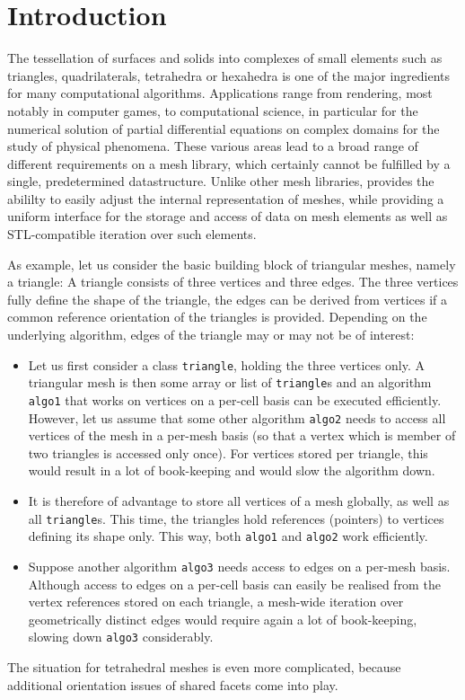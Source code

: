 
\chapter*{Introduction}    \label{intro}

The tessellation of surfaces and solids into complexes of small elements such as triangles, quadrilaterals, tetrahedra or hexahedra is one of the major
ingredients for many computational algorithms. Applications range from rendering, most notably in computer games, to computational science, in particular for the numerical solution of partial differential equations on complex domains for the study of physical phenomena. These various areas lead to a broad range of different requirements on a mesh library, which certainly cannot be fulfilled by a single, predetermined datastructure. Unlike other mesh libraries, {\ViennaGrid} provides the abililty to easily adjust the internal representation of meshes, while providing a uniform interface for the storage and access of data on mesh elements as well as STL-compatible iteration over such elements.

As example, let us consider the basic building block of triangular meshes, namely a triangle: A triangle consists of three vertices and three edges. The three vertices fully define the shape of the triangle, the edges can be derived from vertices if a common reference orientation of the triangles is provided. Depending on the underlying algorithm, edges of the triangle may or may not be of interest:
\begin{itemize}
 \item Let us first consider a class \lstinline|triangle|, holding the three vertices only. A triangular mesh is then some array or list of \lstinline|triangle|s and an algorithm \texttt{algo1} that works on vertices on a per-cell basis can be executed efficiently. However, let us assume that some other algorithm \texttt{algo2} needs to access all vertices of the mesh in a per-mesh basis (so that a vertex which is member of two triangles is accessed only once). For vertices stored per triangle, this would result in a lot of book-keeping and would slow the algorithm down.

 \item It is therefore of advantage to store all vertices of a mesh globally, as well as all \lstinline|triangle|s. This time, the triangles hold references (pointers) to vertices defining its shape only. This way, both \texttt{algo1} and \texttt{algo2} work efficiently.

 \item Suppose another algorithm \texttt{algo3} needs access to edges on a per-mesh basis. Although access to edges on a per-cell basis can easily be realised from the vertex references stored on each triangle, a mesh-wide iteration over geometrically distinct edges would require again a lot of book-keeping, slowing down \texttt{algo3} considerably. 
\end{itemize}
The situation for tetrahedral meshes is even more complicated, because additional orientation issues of shared facets come into play.

